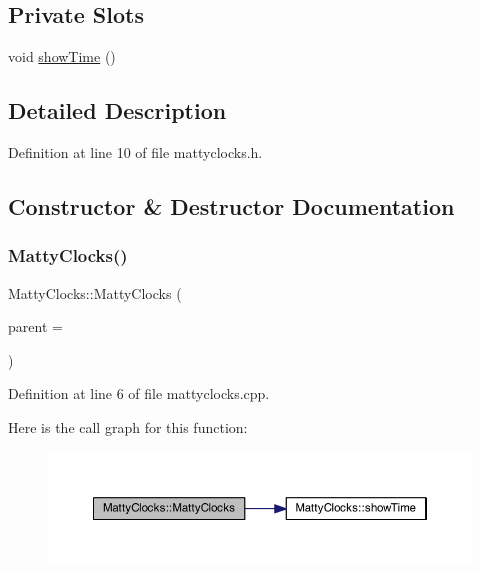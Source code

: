 \subsection*{Private Slots}
\begin{DoxyCompactItemize}
\item 
void \hyperlink{classMattyClocks_a0104aa028d5bb73ca7fbbc1bf3488855}{show\+Time} ()
\end{DoxyCompactItemize}


\subsection{Detailed Description}


Definition at line 10 of file mattyclocks.\+h.



\subsection{Constructor \& Destructor Documentation}
\hypertarget{classMattyClocks_aa102bc39b1a1cc5aa1722cecf4779bf0}{}\label{classMattyClocks_aa102bc39b1a1cc5aa1722cecf4779bf0} 
\subsubsection{\texorpdfstring{Matty\+Clocks()}{MattyClocks()}}
{\footnotesize\ttfamily Matty\+Clocks\+::\+Matty\+Clocks (\begin{DoxyParamCaption}\item[{Q\+Widget $\ast$}]{parent = {} }\end{DoxyParamCaption})}



Definition at line 6 of file mattyclocks.\+cpp.

Here is the call graph for this function\+:
\nopagebreak
\begin{figure}[H]
\begin{center}
\leavevmode
\includegraphics[width=350pt]{classMattyClocks_aa102bc39b1a1cc5aa1722cecf4779bf0_cgraph}
\end{center}
\end{figure}
\hypertarget{classMattyClocks_a62e37b4d89d3ca8f2f42299da93df5a4}{}\label{classMattyClocks_a62e37b4d89d3ca8f2f42299da93df5a4} 
